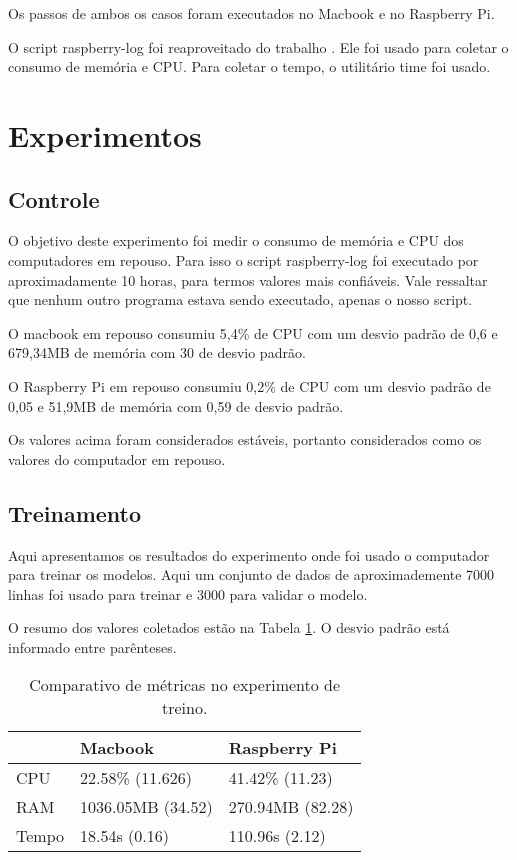 Os passos de ambos os casos foram executados no Macbook e no Raspberry Pi.

O script raspberry-log foi reaproveitado do trabalho \cite{tcc:lucas}. Ele foi usado para 
coletar o consumo de memória e CPU. Para coletar o tempo, o utilitário time 
foi usado.


\section{Experimentos}

\subsection{Controle}

O objetivo deste experimento foi medir o consumo de memória e CPU dos computadores
em repouso. Para isso o script raspberry-log foi executado por aproximadamente 10 horas, 
para termos valores mais confiáveis. Vale ressaltar que nenhum outro programa estava sendo 
executado, apenas o nosso script.

O macbook em repouso consumiu 5,4\% de CPU com um desvio padrão de 0,6 
e 679,34MB de memória com 30 de desvio padrão.

O Raspberry Pi em repouso consumiu 0,2\% de CPU com um desvio padrão de 0,05 
e 51,9MB de memória com 0,59 de desvio padrão.

Os valores acima foram considerados estáveis, portanto considerados como os valores
do computador em repouso.



\subsection{Treinamento}

Aqui apresentamos os resultados do experimento onde foi usado o computador para treinar os
modelos. Aqui um conjunto de dados de aproximademente 7000 linhas foi 
usado para treinar e 3000 para validar o modelo.

O resumo dos valores coletados estão na Tabela \ref{tab:comparativo_treino}. O desvio 
padrão está informado entre parênteses.

\begin{table}[!ht]
    \centering
    \begin{tabular}{|l|l|l|}
    \hline
        ~ & Macbook & Raspberry Pi \\ \hline
        CPU & 22.58\% (11.626) & 41.42\% (11.23) \\ \hline
        RAM & 1036.05MB (34.52) & 270.94MB (82.28) \\ \hline
        Tempo & 18.54s (0.16) & 110.96s (2.12) \\ \hline
    \end{tabular}

    \caption{Comparativo de métricas no experimento de treino.\label{tab:comparativo_treino}}
\end{table}

